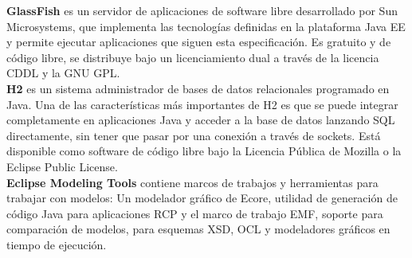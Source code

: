 \textbf{GlassFish} es un servidor de aplicaciones de software libre desarrollado por Sun Microsystems, que implementa las tecnologías definidas en la plataforma Java EE y permite ejecutar aplicaciones que siguen esta especificación. Es gratuito y de código libre, se distribuye bajo un licenciamiento dual a través de la licencia CDDL y la GNU GPL.\\

\textbf{H2} es un sistema administrador de bases de datos relacionales programado en Java. Una de las características más importantes de H2 es que se puede integrar completamente en aplicaciones Java y acceder a la base de datos lanzando SQL directamente, sin tener que pasar por una conexión a través de sockets. Está disponible como software de código libre bajo la Licencia Pública de Mozilla o la Eclipse Public License.\\

\textbf{Eclipse Modeling Tools} contiene marcos de trabajos y herramientas para trabajar con modelos: Un modelador gráfico de Ecore, utilidad de generación de código Java para aplicaciones RCP y el marco de trabajo EMF, soporte para comparación de modelos, para esquemas XSD, OCL y modeladores gráficos en tiempo de ejecución.    
